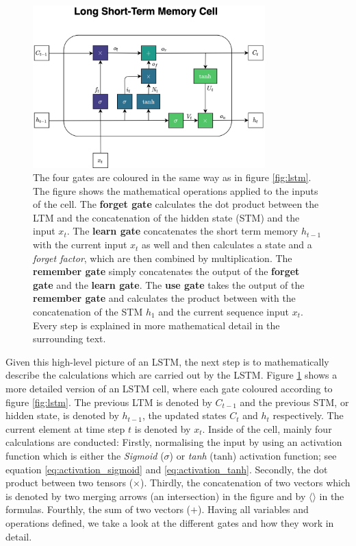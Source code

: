 \documentclass[11pt]{scrartcl}
\begin{document}
\begin{figure}[hbt]
	\center
	\includegraphics[width=0.8\textwidth]{img/general/LSTM-detailed.png}
	\caption{The four gates are coloured in the same way as in figure \ref{fig:lstm}. The figure shows the mathematical operations applied to the inputs of the cell. The \textcolor{viridis1}{\textbf{forget gate}} calculates the dot product between the LTM and the concatenation of the hidden state (STM) and the input $x_t$. The \textcolor{viridis3}{\textbf{learn gate}} concatenates the short term memory $h_{t-1}$ with the current input $x_t$ as well and then calculates a state and a \textit{forget factor}, which are then combined by multiplication. The \textcolor{viridis5}{\textbf{remember gate}} simply concatenates the output of the \textcolor{viridis1}{\textbf{forget gate}} and the \textcolor{viridis3}{\textbf{learn gate}}. The \textcolor{viridis7}{\textbf{use gate}} takes the output of the \textcolor{viridis5}{\textbf{remember gate}} and calculates the product between with the concatenation of the STM $h_1$ and the current sequence input $x_t$. Every step is explained in more mathematical detail in the surrounding text.}
	\label{fig:lstm-detailed}
\end{figure}

Given this high-level picture of an LSTM, the next step is to mathematically describe the calculations which are carried out by the LSTM. Figure \ref{fig:lstm-detailed} shows a more detailed version of an LSTM cell, where each gate coloured according to figure \ref{fig:lstm}. The previous LTM is denoted by $C_{t-1}$ and the previous STM, or hidden state, is denoted by $h_{t-1}$, the updated states $C_t$ and $h_t$ respectively. The current element at time step $t$ is denoted by $x_t$. Inside of the cell, mainly four calculations are conducted: Firstly, normalising the input by using an activation function which is either the \textit{Sigmoid} ($\sigma$) or \textit{tanh} ($\text{tanh}$) activation function; see equation \ref{eq:activation_sigmoid} and \ref{eq:activation_tanh}. Secondly, the dot product between two tensors ($\times$). Thirdly, the concatenation of two vectors which is denoted by two merging arrows (an intersection) in the figure and by $\langle \rangle$ in the formulas. Fourthly, the sum of two vectors ($+$). Having all variables and operations defined, we take a look at the different gates and how they work in detail.
\end{document}
